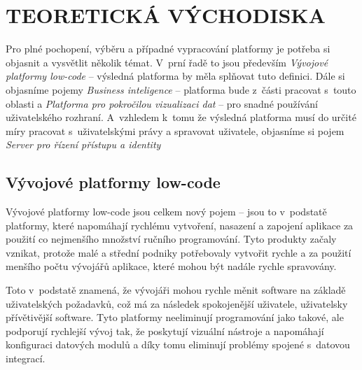 \chapter{TEORETICKÁ VÝCHODISKA}
\par Pro plné pochopení, výběru a případné vypracování platformy je potřeba si objasnit a vysvětlit několik témat. V~prní řadě to jsou především \textit{Vývojové platformy low-code} -- výsledná platforma by měla splňovat tuto definici. Dále si objasníme pojemy \textit{Business inteligence} -- platforma bude z~části pracovat s~touto oblasti a \textit{Platforma pro pokročilou vizualizaci dat} -- pro snadné používání uživatelského rozhraní. A~vzhledem k~tomu že výsledná platforma musí do určité míry pracovat s~uživatelskými právy a spravovat uživatele, objasníme si pojem \textit{Server pro řízení přístupu a identity}

\section{Vývojové platformy low-code}
\par Vývojové platformy low-code jsou celkem nový pojem -- jsou to v~podstatě platformy, které napomáhají rychlému vytvoření, nasazení a zapojení aplikace za použití co nejmenšího množství ručního programování. Tyto produkty začaly vznikat, protože malé a střední podniky potřebovaly vytvořit rychle a za použití menšího počtu vývojářů aplikace, které mohou být nadále rychle spravovány. \cite{pcmag-no-coding}

\par Toto v~podstatě znamená, že vývojáři mohou rychle měnit software na základě uživatelských požadavků, což má za následek spokojenější uživatele, uživatelsky přívětivější software. Tyto platformy neeliminují programování jako takové, ale podporují rychlejší vývoj tak, že poskytují vizuální nástroje a napomáhají konfiguraci datových modulů a díky tomu eliminují problémy spojené s~datovou integrací. \cite{low-code-customer-want}

